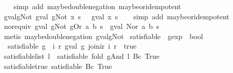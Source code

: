\begin{isabellebody}
%
\isadelimproof
\ \ %
\endisadelimproof
%
\isatagproof
{}\isamarkupfalse%
\ {\isacharparenleft}simp\ add{\isacharcolon}\ maybe{\isacharunderscore}double{\isacharunderscore}negation\ maybe{\isacharunderscore}or{\isacharunderscore}idempotent{\isacharparenright}%
\endisatagproof
{\isafoldproof}%
%
\isadelimproof
\isanewline
%
\endisadelimproof
\isanewline
{}\isamarkupfalse%
\ gval{\isacharunderscore}gNot{\isacharcolon}\ {\isachardoublequoteopen}gval\ {\isacharparenleft}gNot\ x{\isacharparenright}\ s\ {\isacharequal}\ {\isasymnot}\isactrlsub {\isacharquery}\ {\isacharparenleft}gval\ x\ s{\isacharparenright}{\isachardoublequoteclose}\isanewline
%
\isadelimproof
\ \ %
\endisadelimproof
%
\isatagproof
{}\isamarkupfalse%
\ {\isacharparenleft}simp\ add{\isacharcolon}\ maybe{\isacharunderscore}or{\isacharunderscore}idempotent{\isacharparenright}%
\endisatagproof
{\isafoldproof}%
%
\isadelimproof
\isanewline
%
\endisadelimproof
\isanewline
{}\isamarkupfalse%
\ nor{\isacharunderscore}equiv{\isacharcolon}\ {\isachardoublequoteopen}gval\ {\isacharparenleft}gNot\ {\isacharparenleft}gOr\ a\ b{\isacharparenright}{\isacharparenright}\ s\ {\isacharequal}\ gval\ {\isacharparenleft}Nor\ a\ b{\isacharparenright}\ s{\isachardoublequoteclose}\isanewline
%
\isadelimproof
\ \ %
\endisadelimproof
%
\isatagproof
{}\isamarkupfalse%
\ {\isacharparenleft}metis\ maybe{\isacharunderscore}double{\isacharunderscore}negation\ gval{\isacharunderscore}gNot{\isacharparenright}%
\endisatagproof
{\isafoldproof}%
%
\isadelimproof
\isanewline
%
\endisadelimproof
\isanewline
{}\isamarkupfalse%
\ satisfiable\ {\isacharcolon}{\isacharcolon}\ {\isachardoublequoteopen}gexp\ {\isasymRightarrow}\ bool{\isachardoublequoteclose}\ \isanewline
\ \ {\isachardoublequoteopen}satisfiable\ g\ {\isasymequiv}\ {\isacharparenleft}{\isasymexists}i\ r{\isachardot}\ gval\ g\ {\isacharparenleft}join{\isacharunderscore}ir\ i\ r{\isacharparenright}\ {\isacharequal}\ true{\isacharparenright}{\isachardoublequoteclose}\isanewline
\isanewline
{}\isamarkupfalse%
\ {\isachardoublequoteopen}satisfiable{\isacharunderscore}list\ l\ {\isacharequal}\ satisfiable\ {\isacharparenleft}fold\ gAnd\ l\ {\isacharparenleft}Bc\ True{\isacharparenright}{\isacharparenright}{\isachardoublequoteclose}\isanewline
\isanewline
{}\isamarkupfalse%
\ satisfiable{\isacharunderscore}true{\isacharcolon}\ {\isachardoublequoteopen}satisfiable\ {\isacharparenleft}Bc\ True{\isacharparenright}{\isachardoublequoteclose}\isanewline

\end{isabellebody}
